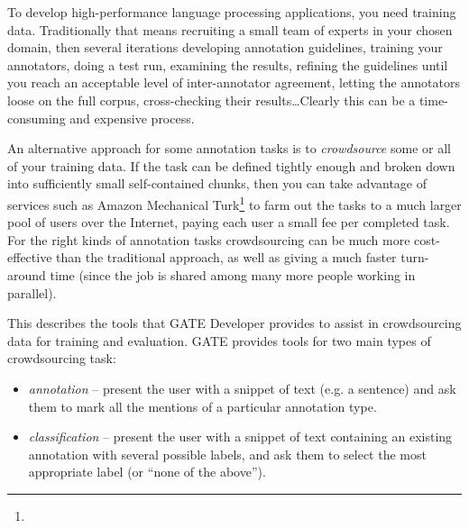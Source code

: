 %
%
%


\nnormalsize

To develop high-performance language processing applications, you need training
data.  Traditionally that means recruiting a small team of experts in your
chosen domain, then several iterations developing annotation guidelines,
training your annotators, doing a test run, examining the results, refining the
guidelines until you reach an acceptable level of inter-annotator agreement,
letting the annotators loose on the full corpus, cross-checking their
results\ldots  Clearly this can be a time-consuming and expensive process.

An alternative approach for some annotation tasks is to \emph{crowdsource} some
or all of your training data.  If the task can be defined tightly enough and
broken down into sufficiently small self-contained chunks, then you can take
advantage of services such as Amazon Mechanical
Turk\footnote{} to farm out the tasks to a
much larger pool of users over the Internet, paying each user a small fee per
completed task.  For the right kinds of annotation tasks crowdsourcing can be
much more cost-effective than the traditional approach, as well as giving a
much faster turn-around time (since the job is shared among many more people
working in parallel).

This \chapthing{} describes the tools that GATE Developer provides to assist in
crowdsourcing data for training and evaluation.  GATE provides tools for two
main types of crowdsourcing task:

\begin{itemize}
\item \emph{annotation} -- present the user with a snippet of text (e.g.
  a sentence) and ask them to mark all the mentions of a particular annotation
  type.
\item \emph{classification} -- present the user with a snippet of text
  containing an existing annotation with several possible labels, and ask them
  to select the most appropriate label (or ``none of the above'').
\end{itemize}

